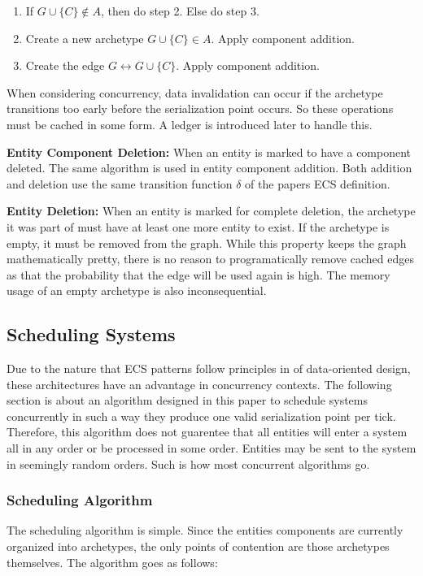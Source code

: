 \begin{enumerate}
    \item If $G \cup \{C\} \not\in A$, then do step 2. Else do step 3.
    \item Create a new archetype $G \cup \{C\} \in A$. Apply component addition.
    \item Create the edge $G \leftrightarrow G \cup \{C\}$. Apply component addition.
\end{enumerate}

When considering concurrency, data invalidation can occur if the archetype transitions too early before the serialization point occurs. So these operations must be cached in some form. A ledger is introduced later to handle this.

\textbf{Entity Component Deletion: } When an entity is marked to have a component deleted. The same algorithm is used in entity component addition. Both addition and deletion use the same transition function $\delta$ of the papers ECS definition.  

\textbf{Entity Deletion: } When an entity is marked for complete deletion, the archetype it was part of must have at least one more entity to exist. If the archetype is empty, it must be removed from the graph. While this property keeps the graph mathematically pretty, there is no reason to programatically remove cached edges as that the probability that the edge will be used again is high. The memory usage of an empty archetype is also inconsequential. 

\subsection{Scheduling Systems}
\label{sec:scheduling}

Due to the nature that ECS patterns follow principles in of data-oriented design, these architectures have an advantage in concurrency contexts. The following section is about an algorithm designed in this paper to schedule systems concurrently in such a way they produce one valid serialization point per tick. Therefore, this algorithm does not guarentee that all entities will enter a system all in any order or be processed in some order. Entities may be sent to the system in seemingly random orders. Such is how most concurrent algorithms go.

\subsubsection{Scheduling Algorithm}
The scheduling algorithm is simple. Since the entities components are currently organized into archetypes, the only points of contention are those archetypes themselves. The algorithm goes as follows:

